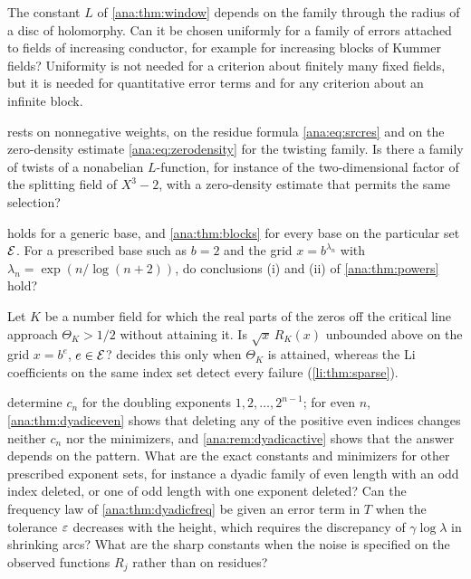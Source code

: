 \begin{question}\label{ana:q:window}
The constant $L$ of \cref{ana:thm:window} depends on the family through the radius of a disc
of holomorphy. Can it be chosen uniformly for a family of errors attached to fields of
increasing conductor, for example for increasing blocks of Kummer fields? Uniformity is not
needed for a criterion about finitely many fixed fields, but it is needed for quantitative
error terms and for any criterion about an infinite block.
\end{question}

\begin{question}\label{ana:q:twist}
 rests on nonnegative weights, on the residue formula
\eqref{ana:eq:srcres} and on the zero-density estimate \eqref{ana:eq:zerodensity} for the
twisting family. Is there a family of twists of a nonabelian $L$-function, for instance of the
two-dimensional factor of the splitting field of $X^3-2$, with a zero-density estimate that
permits the same selection?
\end{question}

\begin{question}\label{ana:q:base}
 holds for a generic base, and \cref{ana:thm:blocks} for every base on
the particular set $\mathcal{E}$. For a prescribed base such as $b=2$ and the grid
$x=b^{\lambda_n}$ with $\lambda_n=\exp(n/\log(n+2))$, do conclusions (i) and (ii) of
\cref{ana:thm:powers} hold?
\end{question}

\begin{question}\label{ana:q:sup}
Let $K$ be a number field for which the real parts of the zeros off the critical line approach
$\Theta_K>1/2$ without attaining it. Is $\sqrt x\,R_K(x)$ unbounded above on the grid
$x=b^e$, $e\in\mathcal{E}$?  decides this only when $\Theta_K$ is attained,
whereas the Li coefficients on the same index set detect every failure
(\cref{li:thm:sparse}).
\end{question}

\begin{question}\label{ana:q:dyadic}
 determine $c_n$ for the
doubling exponents $1,2,\dots,2^{n-1}$; for even $n$, \cref{ana:thm:dyadiceven} shows that
deleting any of the positive even indices changes neither $c_n$ nor the minimizers, and
\cref{ana:rem:dyadicactive} shows that the answer depends on the pattern. What are the exact
constants and minimizers for other prescribed exponent sets, for instance a dyadic family of
even length with an odd index deleted, or one of odd length with one exponent deleted? Can the frequency
law of \cref{ana:thm:dyadicfreq} be given an error term in $T$ when the tolerance $\varepsilon$
decreases with the height, which requires the discrepancy of $\gamma\log\lambda$ in shrinking
arcs? What are the sharp constants when the noise is specified on the observed functions
$R_j$ rather than on residues?
\end{question}

